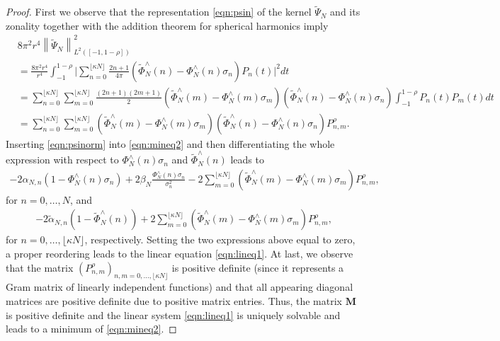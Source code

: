 \documentclass[a4paper, 10pt]{article}
\numberwithin{equation}{section}
\theoremstyle{definition}
\begin{document}
\begin{proof}
First we observe that the representation \eqref{eqn:psin} of the kernel $\tilde{\Psi}_N$ and its zonality together with the addition theorem for spherical harmonics imply 
\small
\begin{align}\label{eqn:psinorm}
&8\pi^2 r^4\left\|\tilde{\Psi}_N\right\|^2_{L^2([-1,1-\rho])}
\\&=\frac{8\pi^2 r^4}{r^4}\int_{-1}^{1-\rho}\Bigg|\sum_{n=0}^{\lfloor\kappa N\rfloor}\frac{2n+1}{4\pi}\left(\tilde{\Phi}_{N}^\wedge(n)-\Phi_N^\wedge(n)\sigma_n\right)P_n(t)\Bigg|^2dt\nonumber
\\&=\sum_{n=0}^{\lfloor\kappa N\rfloor}\sum_{m=0}^{\lfloor\kappa N\rfloor}\frac{(2n+1)(2m+1)}{2}\left(\tilde{\Phi}_{N}^\wedge(m)-\Phi_N^\wedge(m)\sigma_m\right)\left(\tilde{\Phi}_{N}^\wedge(n)-\Phi_N^\wedge(n)\sigma_n\right)\int_{-1}^{1-\rho}\!\!\!\!\!\!\!P_n(t)P_m(t)dt\nonumber
\\&=\sum_{n=0}^{\lfloor\kappa N\rfloor}\sum_{m=0}^{\lfloor\kappa N\rfloor}\left(\tilde{\Phi}_{N}^\wedge(m)-\Phi_N^\wedge(m)\sigma_m\right)\left(\tilde{\Phi}_{N}^\wedge(n)-\Phi_N^\wedge(n)\sigma_n\right)P_{n,m}^\rho.\nonumber
\end{align}
\normalsize
Inserting \eqref{eqn:psinorm} into \eqref{eqn:mineq2} and then differentiating the whole expression with respect to $\Phi_N^\wedge(n)\sigma_n$ and $\tilde{\Phi}_{N}^\wedge(n)$ leads to 
\begin{align}
-2\alpha_{N,n}(1-\Phi_N^\wedge(n)\sigma_n)+2\beta_N\frac{\Phi_N^\wedge(n)\sigma_n}{\sigma_n^2}-2\sum_{m=0}^{\lfloor\kappa N\rfloor}\left(\tilde{\Phi}_{N}^\wedge(m)-\Phi_N^\wedge(m)\sigma_m\right)P_{n,m}^\rho,
\end{align} 
for $n=0,\ldots,N$, and
\begin{align}
-2\tilde{\alpha}_{N,n}(1-\tilde{\Phi}_{N}^\wedge(n))+2\sum_{m=0}^{\lfloor\kappa N\rfloor}\left(\tilde{\Phi}_{N}^\wedge(m)-\Phi_N^\wedge(m)\sigma_m\right)P_{n,m}^\rho,
\end{align}
for $n=0,\ldots,\lfloor\kappa N\rfloor$, respectively. Setting the two expressions above equal to zero, a proper reordering leads to the linear equation \eqref{eqn:lineq1}. At last, we observe that the matrix $(P_{n,m}^\rho)_{n,m=0,\ldots,\lfloor\kappa N\rfloor}$ is positive definite (since it represents a Gram matrix of linearly independent functions) and that all appearing diagonal matrices are positive definite due to positive matrix entries. Thus, the matrix $\mathbf{M}$ is positive definite and the linear system \eqref{eqn:lineq1} is uniquely solvable and leads to a minimum of \eqref{eqn:mineq2}.
\end{proof}
\end{document}
